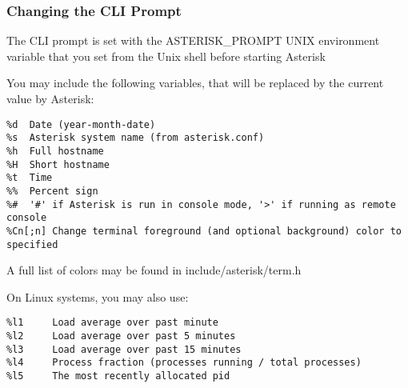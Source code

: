 \subsubsection{Changing the CLI Prompt}

The CLI prompt is set with the ASTERISK\_PROMPT UNIX environment variable that
you set from the Unix shell before starting Asterisk

You may include the following variables, that will be replaced by
the current value by Asterisk:

\begin{verbatim}
%d	Date (year-month-date)
%s	Asterisk system name (from asterisk.conf)
%h	Full hostname
%H	Short hostname
%t	Time
%%	Percent sign
%#	'#' if Asterisk is run in console mode, '>' if running as remote console
%Cn[;n]	Change terminal foreground (and optional background) color to specified
\end{verbatim}

A full list of colors may be found in include/asterisk/term.h

On Linux systems, you may also use:

\begin{verbatim}
%l1     Load average over past minute
%l2     Load average over past 5 minutes
%l3     Load average over past 15 minutes
%l4     Process fraction (processes running / total processes)
%l5     The most recently allocated pid
\end{verbatim}

